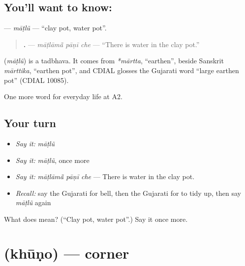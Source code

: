 \subsection*{You'll want to know: }
\textbf{} — \emph{māṭlũ} — \textquotedblleft{}clay pot, water pot\textquotedblright{}.

\begin{quote}
\textbf{  .} — \emph{māṭlāmā̃ pāṇī che} — \textquotedblleft{}There is water in the clay pot.\textquotedblright{}
\end{quote}

\begin{cousinweb}
\textbf{} (\emph{māṭlũ}) is a tadbhava. It comes from \emph{*mārtta}, \textquotedblleft{}earthen\textquotedblright{}, beside Sanskrit \emph{mārttika}, \textquotedblleft{}earthen pot\textquotedblright{}, and CDIAL glosses the Gujarati word \textquotedblleft{}large earthen pot\textquotedblright{} (CDIAL 10085).
\end{cousinweb}

\begin{grammarlens}[title={What you've built}]
One more word for everyday life at A2.
\end{grammarlens}

\subsection*{Your turn}
\begin{itemize}
\raggedright
  \item \emph{Say it:} \emph{māṭlũ}
  \item \emph{Say it:} \emph{māṭlũ}, once more
  \item \emph{Say it:} \emph{māṭlāmā̃ pāṇī che} — There is water in the clay pot.
  \item \emph{Recall:} say the Gujarati for bell, then the Gujarati for to tidy up, then say \emph{māṭlũ} again
\end{itemize}

\begin{tcolorbox}[breakable,colback=teal!4,colframe=teal!35!black,title={Before you move on}]
What does  mean? (\textquotedblleft{}Clay pot, water pot\textquotedblright{}.) Say it once more.
\end{tcolorbox}
\section[\texorpdfstring{\gu{ખૂણો} (khūṇo)}{ખૂણો (khūṇo)}]{ (khūṇo) — corner}

